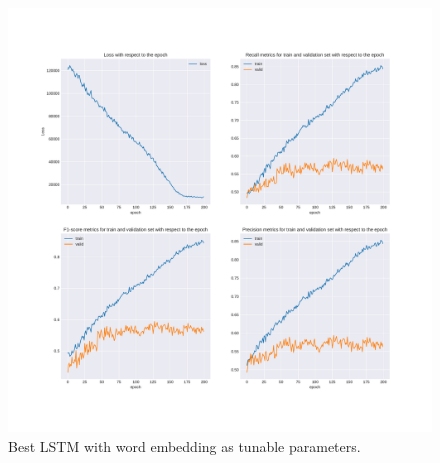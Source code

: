 \begin{figure}
 \centering
 \includegraphics[width=\textwidth]{images/chapitre4/lstm1}
 \caption{Best LSTM with word embedding as tunable parameters.}
 \label{fig:chap4:lstm1}
\end{figure}

